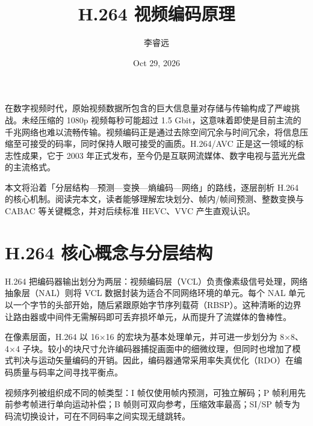 \title{H.264 视频编码原理}
\author{李睿远}
\date{Oct 29, 2026}
\maketitle
在数字视频时代，原始视频数据所包含的巨大信息量对存储与传输构成了严峻挑战。未经压缩的 1080p 视频每秒可能超过 1.5 Gbit，这意味着即使是目前主流的千兆网络也难以流畅传输。视频编码正是通过去除空间冗余与时间冗余，将信息压缩至可接受的码率，同时保持人眼可接受的画质。H.264/AVC 正是这一领域的标志性成果，它于 2003 年正式发布，至今仍是互联网流媒体、数字电视与蓝光光盘的主流格式。\par
本文将沿着「分层结构—预测—变换—熵编码—网络」的路线，逐层剖析 H.264 的核心机制。阅读完本文，读者能够理解宏块划分、帧内/帧间预测、整数变换与 CABAC 等关键概念，并对后续标准 HEVC、VVC 产生直观认识。\par
\chapter{H.264 核心概念与分层结构}
H.264 把编码器输出划分为两层：视频编码层（VCL）负责像素级信号处理，网络抽象层（NAL）则将 VCL 数据封装为适合不同网络环境的单元。每个 NAL 单元以一个字节的头部开始，随后紧跟原始字节序列载荷（RBSP）。这种清晰的边界让路由器或中间件无需解码即可丢弃损坏单元，从而提升了流媒体的鲁棒性。\par
在像素层面，H.264 以 16×16 的宏块为基本处理单元，并可进一步划分为 8×8、4×4 子块。较小的块尺寸允许编码器捕捉画面中的细微纹理，但同时也增加了模式判决与运动矢量编码的开销。因此，编码器通常采用率失真优化（RDO）在编码质量与码率之间寻找平衡点。\par
视频序列被组织成不同的帧类型：I 帧仅使用帧内预测，可独立解码；P 帧利用先前参考帧进行单向运动补偿；B 帧则可双向参考，压缩效率最高；SI/SP 帧专为码流切换设计，可在不同码率之间实现无缝跳转。\par
